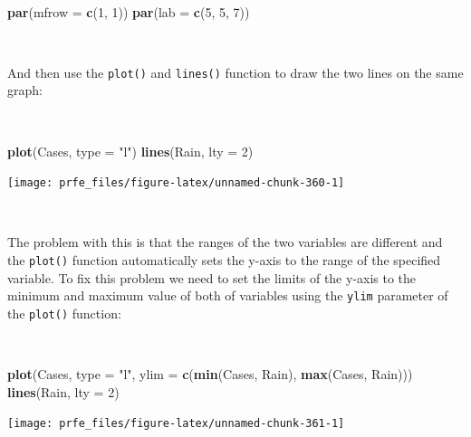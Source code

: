 \documentclass[12pt,a4paper]{book}
\newenvironment{Shaded}{\begin{snugshade}}{\end{snugshade}}
\newcommand{\KeywordTok}[1]{\textcolor[rgb]{0.13,0.29,0.53}{\textbf{#1}}}
\newcommand{\DataTypeTok}[1]{\textcolor[rgb]{0.13,0.29,0.53}{#1}}
\newcommand{\DecValTok}[1]{\textcolor[rgb]{0.00,0.00,0.81}{#1}}
\newcommand{\StringTok}[1]{\textcolor[rgb]{0.31,0.60,0.02}{#1}}
\newcommand{\NormalTok}[1]{#1}
\theoremstyle{definition}
\theoremstyle{definition}
\theoremstyle{definition}
\theoremstyle{remark}
\begin{document}
~

\begin{Shaded}
\begin{Highlighting}[]
\KeywordTok{par}\NormalTok{(}\DataTypeTok{mfrow =} \KeywordTok{c}\NormalTok{(}\DecValTok{1}\NormalTok{, }\DecValTok{1}\NormalTok{))}
\KeywordTok{par}\NormalTok{(}\DataTypeTok{lab =} \KeywordTok{c}\NormalTok{(}\DecValTok{5}\NormalTok{, }\DecValTok{5}\NormalTok{, }\DecValTok{7}\NormalTok{))}
\end{Highlighting}
\end{Shaded}

~

And then use the \texttt{plot()} and \texttt{lines()} function to draw
the two lines on the same graph:

~

\begin{Shaded}
\begin{Highlighting}[]
\KeywordTok{plot}\NormalTok{(Cases, }\DataTypeTok{type =} \StringTok{"l"}\NormalTok{)}
\KeywordTok{lines}\NormalTok{(Rain, }\DataTypeTok{lty =} \DecValTok{2}\NormalTok{)}
\end{Highlighting}
\end{Shaded}

\begin{center}\texttt{[image: prfe\_files/figure-latex/unnamed-chunk-360-1]} \end{center}

~

The problem with this is that the ranges of the two variables are
different and the \texttt{plot()} function automatically sets the y-axis
to the range of the specified variable. To fix this problem we need to
set the limits of the y-axis to the minimum and maximum value of both of
variables using the \texttt{ylim} parameter of the \texttt{plot()}
function:

~

\begin{Shaded}
\begin{Highlighting}[]
\KeywordTok{plot}\NormalTok{(Cases, }\DataTypeTok{type =} \StringTok{"l"}\NormalTok{, }\DataTypeTok{ylim =} \KeywordTok{c}\NormalTok{(}\KeywordTok{min}\NormalTok{(Cases, Rain), }\KeywordTok{max}\NormalTok{(Cases, Rain)))}
\KeywordTok{lines}\NormalTok{(Rain, }\DataTypeTok{lty =} \DecValTok{2}\NormalTok{)}
\end{Highlighting}
\end{Shaded}

\begin{center}\texttt{[image: prfe\_files/figure-latex/unnamed-chunk-361-1]} \end{center}
\end{document}
